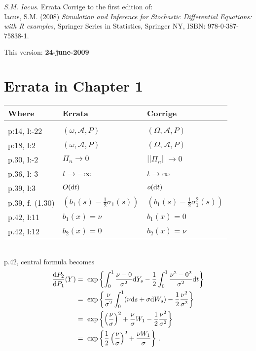 \documentclass[11pt]{article}
\date{This version}
\def\de{{\rm d}}
\begin{document}
{\it S.M. Iacus}. Errata Corrige to the first edition of: \\

Iacus, S.M. (2008) {\it Simulation and Inference for Stochastic Differential  Equations: with R examples}, Springer Series in Statistics, Springer NY,  ISBN: 978-0-387-75838-1.
\\
\bigskip

This version: {\bf 24-june-2009}

\section*{Errata in Chapter 1}
\begin{tabular}{lll}
Where & Errata & Corrige\\
\hline
\\
p:14, l:-22 &$(\omega, \mathcal A, P)$ & $(\Omega, \mathcal A, P)$\\
p:18, l:2 &$(\omega, \mathcal A, P)$& $(\Omega, \mathcal A, P)$\\
p.30, l:-2 &$\Pi_n\to 0$ & $||\Pi_n||\to 0$\\
p.36, l:-3 & $t \to -\infty$ & $t\to \infty$\\
p.39, l:3 & $O(\de t)$ & $o(\de t)$\\
p.39, f. (1.30) & $\displaystyle\left(b_1(s)-\frac12\sigma_1(s)\right)$ & $\displaystyle\left(b_1(s)-\frac12\sigma_1^2(s)\right)$  \\
p.42, l:11 & $b_1(x)=\nu$ & $b_1(x)=0$\\
p.42, l:12 & $b_2(x)=0$  &$b_2(x)=\nu$\\
\end{tabular}\\

p.42, central formula becomes
$$
\begin{aligned}
\frac{\de P_2}{\de P_1}(Y) &=\,\,  \exp\left\{
\int_0^1 \frac{\nu-0}{\sigma^2}\de Y_s -\frac12 \int_0^1 \frac{\nu^2-0^2}{\sigma^2}\de t
\right\}\\
&= \,\, \exp\left\{
 \frac{\nu}{\sigma^2}\int_0^1(\nu \de s +\sigma \de W_s) - \frac12  \frac{\nu^2}{\sigma^2}
\right\}\\
&= \,\, \exp\left\{
 \left(\frac{\nu}{\sigma}\right)^2 + \frac{\nu}{\sigma}  W_1 - \frac12  \frac{\nu^2}{\sigma^2}
\right\}\\
&= \,\,\exp\left\{
\frac12  \left(\frac{\nu}{\sigma}\right)^2 + \frac{\nu W_1}{\sigma} 
\right\}\,.
\end{aligned}
$$
\end{document}

